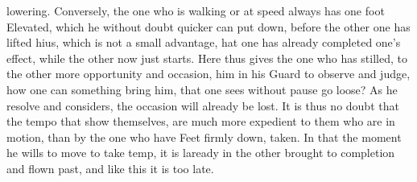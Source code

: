 lowering. Conversely, the one who is walking or at speed always has
one foot Elevated, which he without doubt quicker can put down, before
the other one has lifted hius, which is not a small advantage, hat one
has already completed one's effect, while the other now just starts.
Here thus gives the one who has stilled, to the other more opportunity
and occasion, him in his Guard to observe and judge, how one can
something bring him, that one sees without pause go loose? As he
resolve and considers, the occasion will already be lost. It is thus
no doubt that the tempo that show themselves, are much more expedient
to them who are in motion, than by the one who have Feet firmly down,
taken.  In that the moment he wills to move to take temp, it is
laready in the other brought to completion and flown past, and like
this it is too late.
